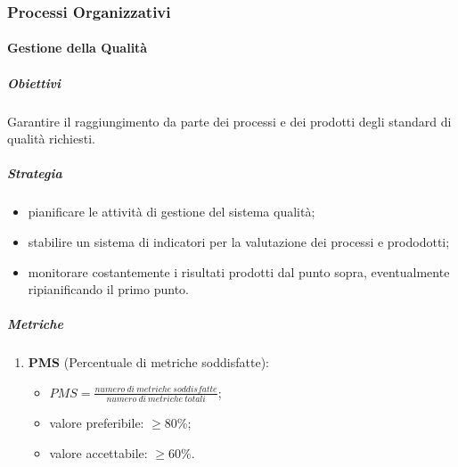    \subsubsection{Processi Organizzativi}
        \paragraph{Gestione della Qualità}
            \subparagraph{Obiettivi}
                Garantire il raggiungimento da parte dei processi e dei prodotti degli standard di qualità richiesti.
            \subparagraph{Strategia}
                \begin{itemize}
                    \item pianificare le attività di gestione del sistema qualità;
                    \item stabilire un sistema di indicatori per la valutazione dei processi e prododotti;
                    \item monitorare costantemente i risultati prodotti dal punto sopra, eventualmente ripianificando il primo punto.
                \end{itemize}
            \subparagraph{Metriche}
            \begin{enumerate}
            \item \textbf{PMS} (Percentuale di metriche soddisfatte):
            \begin{itemize}
                \item $PMS = \frac{numero\ di\ metriche\ soddisfatte}{numero\ di\ metriche\ totali}$;
                \item valore preferibile: $\geq 80\%$;
                \item valore accettabile: $\geq 60\%$.
            \end{itemize}
        \end{enumerate}